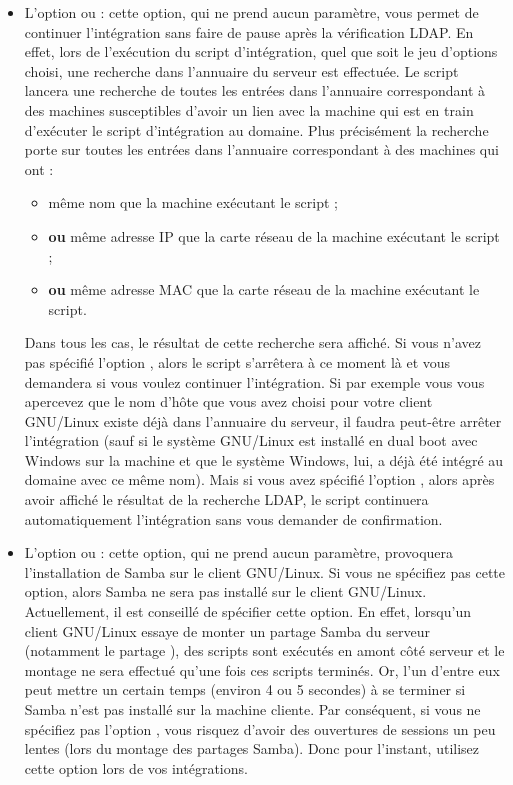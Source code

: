 \begin{itemize}
\item L'option  ou  :
cette option, qui ne prend aucun paramètre, vous permet de 
continuer l'intégration sans faire de pause après la vérification
LDAP. En effet, lors de l'exécution du script d'intégration, quel que soit
le jeu d'options choisi, une recherche
dans l'annuaire du serveur est effectuée. Le script lancera une recherche
de toutes les entrées dans l'annuaire correspondant à des machines susceptibles
d'avoir un lien avec la machine qui est en train d'exécuter 
le script d'intégration au domaine. Plus précisément la recherche porte sur
toutes les entrées dans l'annuaire correspondant à des machines qui ont :
%
\begin{itemize}
\item même nom que la machine exécutant le script  ;
\item \textbf{ou} même adresse IP que la carte réseau de la machine exécutant le script ;
\item \textbf{ou} même adresse MAC que la carte réseau de la machine exécutant le script.
\end{itemize}
%
Dans tous les cas, le résultat de cette recherche sera affiché. Si vous n'avez
pas spécifié l'option , alors le script s'arrêtera à ce
moment là et vous demandera si vous voulez continuer l'intégration. Si par exemple
vous vous apercevez que le nom d'hôte que vous avez choisi pour votre
client GNU/Linux existe déjà dans l'annuaire du serveur, il faudra peut-être
arrêter l'intégration (sauf si le système GNU/Linux est installé en dual boot
avec Windows sur la machine et que le système Windows, lui,
a déjà été intégré au domaine avec ce même nom). Mais si vous avez spécifié
l'option , alors après avoir affiché le résultat de
la recherche LDAP, le script continuera automatiquement
l'intégration sans vous demander de confirmation.

\item L'option  ou  :
cette option, qui ne prend aucun paramètre, provoquera l'installation de Samba
sur le client GNU/Linux. Si vous ne spécifiez pas cette option, alors
Samba ne sera pas installé sur le client GNU/Linux. Actuellement, il est
conseillé de spécifier cette option. En effet, lorsqu'un client GNU/Linux
essaye de monter un partage Samba du serveur (notamment le partage ),
des scripts sont exécutés en amont côté serveur et le montage ne sera effectué qu'une
fois ces scripts terminés. Or, l'un d'entre eux peut mettre un certain temps
(environ 4 ou 5 secondes) à se terminer si Samba n'est pas installé
sur la machine cliente. Par conséquent, si vous ne spécifiez pas l'option
, vous risquez d'avoir des ouvertures de sessions
un peu lentes (lors du montage des partages Samba).
Donc pour l'instant, utilisez cette option lors de vos
intégrations.


\end{itemize}
